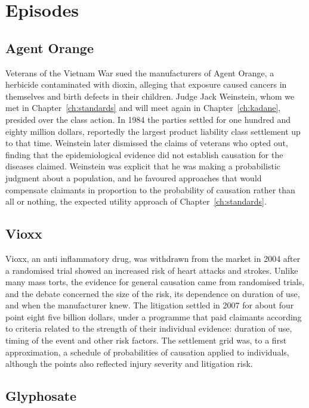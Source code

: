 \section{Episodes}

\subsection{Agent Orange}

Veterans of the Vietnam War sued the manufacturers of Agent Orange, a herbicide contaminated with dioxin, alleging that exposure caused cancers in themselves and birth defects in their children. Judge Jack Weinstein, whom we met in Chapter~\ref{ch:standards} and will meet again in Chapter~\ref{ch:kadane}, presided over the class action. In 1984 the parties settled for one hundred and eighty million dollars, reportedly the largest product liability class settlement up to that time. Weinstein later dismissed the claims of veterans who opted out, finding that the epidemiological evidence did not establish causation for the diseases claimed. Weinstein was explicit that he was making a probabilistic judgment about a population, and he favoured approaches that would compensate claimants in proportion to the probability of causation rather than all or nothing, the expected utility approach of Chapter~\ref{ch:standards}.

\subsection{Vioxx}

Vioxx, an anti inflammatory drug, was withdrawn from the market in 2004 after a randomised trial showed an increased risk of heart attacks and strokes. Unlike many mass torts, the evidence for general causation came from randomised trials, and the debate concerned the size of the risk, its dependence on duration of use, and when the manufacturer knew. The litigation settled in 2007 for about four point eight five billion dollars, under a programme that paid claimants according to criteria related to the strength of their individual evidence: duration of use, timing of the event and other risk factors. The settlement grid was, to a first approximation, a schedule of probabilities of causation applied to individuals, although the points also reflected injury severity and litigation risk.

\subsection{Glyphosate}

